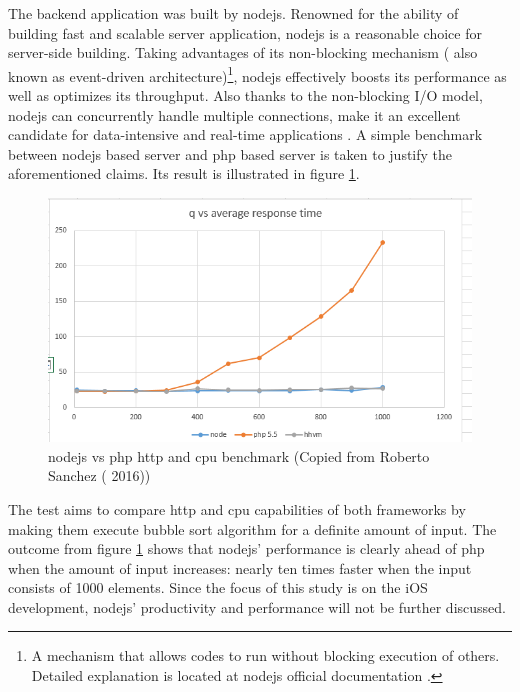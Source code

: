 \documentclass[11pt,a4paper,oneside,article]{memoir}
\begin{document}
The backend application was built by \gls{nodejs}. Renowned for the ability of building fast and scalable server application, \gls{nodejs} is a reasonable choice for server-side building. Taking advantages of its non-blocking mechanism ( also known as event-driven architecture)\footnote{A mechanism that allows codes to run without blocking execution of others. Detailed explanation is located at \gls{nodejs} official documentation \cite{nodejs:nonblocking}.}, \gls{nodejs} effectively boosts its performance as well as optimizes its throughput.\cite{herron:nodejs} Also thanks to the non-blocking I/O model, \gls{nodejs} can concurrently handle multiple connections, make it an excellent candidate for data-intensive and real-time applications \cite{holmes:gettingmean}. A simple benchmark between \gls{nodejs} based server and \gls{php} based server is taken to justify the aforementioned claims. Its result is illustrated in figure \ref{fig:nodejsvsphp}.

\begin{figure}[H]

\centering
\includegraphics[width=\textwidth]{nodejs-vs-php-performance}

\caption{\gls{nodejs} vs \gls{php} \gls{http} and \gls{cpu} benchmark (Copied from Roberto Sanchez ( 2016)\cite{roberto:nodejs})}
\label{fig:nodejsvsphp}

\end{figure}

The test aims to compare \gls{http} and \gls{cpu} capabilities of both frameworks by making them execute bubble sort algorithm for a definite amount of input. The outcome from figure \ref{fig:nodejsvsphp} shows that \gls{nodejs}' performance is clearly ahead of \gls{php} when the amount of input increases: nearly ten times faster when the input consists of 1000 elements. Since the focus of this study is on the iOS development, \gls{nodejs}' productivity and performance will not be further discussed.
\end{document}
